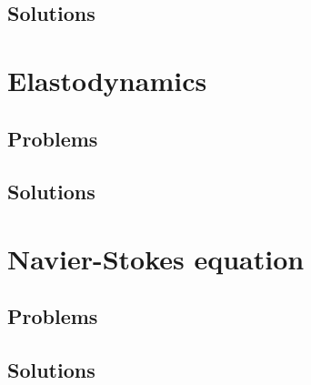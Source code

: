    \section{Solutions}
      \shipoutAnswer

\chapter{Elastodynamics}
   
   
   
   
   \section{Problems}
      
   \section{Solutions}
      \shipoutAnswer

\chapter{Navier-Stokes equation}
   
   
   
   
   
   

   \section{Problems}
      
      
      
      
      
      
      
      
   \section{Solutions}
      \shipoutAnswer

